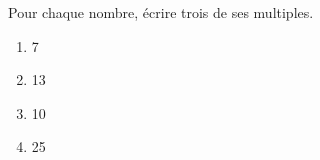 \documentclass[exercice]{thedocument}%
\begin{document}
%
Pour chaque nombre, écrire trois de ses multiples.
\begin{enumerate}
    \item 7
    \item 13
    \item 10
    \item 25
\end{enumerate}
\end{document}
